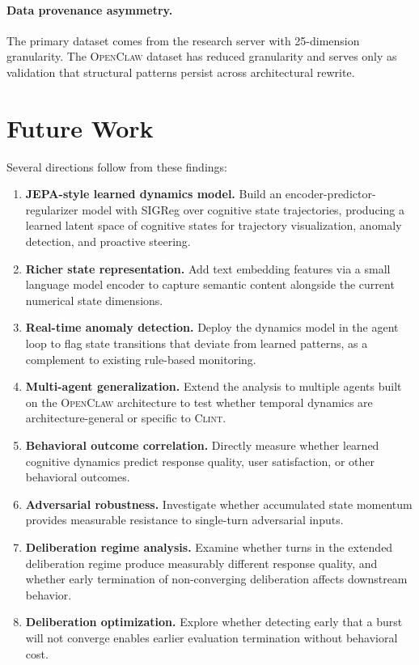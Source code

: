 \documentclass[twoside,11pt]{article}
\newcommand{\sys}{\textsc{Clint}}
\newcommand{\fw}{\textsc{OpenClaw}}
\begin{document}
\paragraph{Data provenance asymmetry.} The primary dataset comes from the
research server with 25-dimension granularity. The \fw{} dataset has reduced
granularity and serves only as validation that structural patterns persist
across architectural rewrite.


\section{Future Work}
\label{sec:future}

Several directions follow from these findings:

\begin{enumerate}
\item \textbf{JEPA-style learned dynamics model.} Build an
encoder-predictor-regularizer model with SIGReg over cognitive state
trajectories, producing a learned latent space of cognitive states for
trajectory visualization, anomaly detection, and proactive steering.

\item \textbf{Richer state representation.} Add text embedding features via a
small language model encoder to capture semantic content alongside the current
numerical state dimensions.

\item \textbf{Real-time anomaly detection.} Deploy the dynamics model in the
agent loop to flag state transitions that deviate from learned patterns, as a
complement to existing rule-based monitoring.

\item \textbf{Multi-agent generalization.} Extend the analysis to multiple
agents built on the \fw{} architecture to test whether temporal dynamics are
architecture-general or specific to \sys{}.

\item \textbf{Behavioral outcome correlation.} Directly measure whether learned
cognitive dynamics predict response quality, user satisfaction, or other
behavioral outcomes.

\item \textbf{Adversarial robustness.} Investigate whether accumulated state
momentum provides measurable resistance to single-turn adversarial inputs.

\item \textbf{Deliberation regime analysis.} Examine whether turns in the
extended deliberation regime produce measurably different response quality, and
whether early termination of non-converging deliberation affects downstream
behavior.

\item \textbf{Deliberation optimization.} Explore whether detecting early that
a burst will not converge enables earlier evaluation termination without
behavioral cost.
\end{enumerate}
\end{document}
